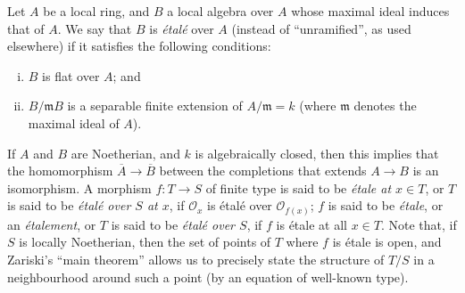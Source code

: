 \documentclass{article}
\newcommand{\scr}[1]{{\mathscr{#1}}}
\newcommand{\fk}[1]{{\mathfrak{#1}}}
\begin{document}
Let $A$ be a local ring, and $B$ a local algebra over $A$ whose maximal ideal induces that of $A$.
We say that $B$ is \emph{\'{e}tal\'{e}} over $A$ (instead of ``unramified'', as used elsewhere) if it satisfies the following conditions:
\begin{enumerate}[(i)]
  \item $B$ is flat over $A$; and
  \item $B/\fk{m}B$ is a separable finite extension of $A/\fk{m}=k$ (where $\fk{m}$ denotes the maximal ideal of $A$).
\end{enumerate}
If $A$ and $B$ are Noetherian, and $k$ is algebraically closed, then this implies that the homomorphism $\overline{A}\to\overline{B}$ between the completions that extends $A\to B$ is an isomorphism.
A morphism $f\colon T\to S$ of finite type is said to be \emph{\'{e}tale at $x\in T$}, or $T$ is said to be \emph{\'{e}tal\'{e} over $S$ at $x$}, if $\scr{O}_x$ is \'{e}tal\'{e} over $\scr{O}_{f(x)}$;
$f$ is said to be \emph{\'{e}tale}, or an \emph{\'{e}talement}, or $T$ is said to be \emph{\'{e}tal\'{e} over $S$}, if $f$ is \'{e}tale at all $x\in T$.
Note that, if $S$ is locally Noetherian, then the set of points of $T$ where $f$ is \'{e}tale is open, and Zariski's ``main theorem'' allows us to precisely state the structure of $T/S$ in a neighbourhood around such a point (by an equation of well-known type).
\end{document}
